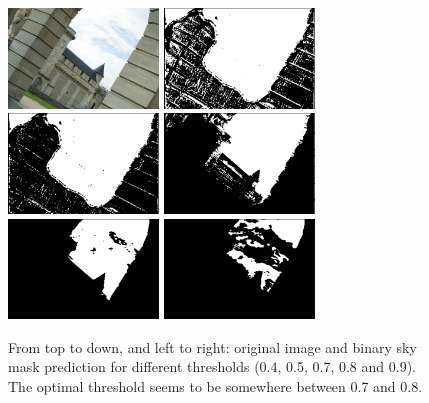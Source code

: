 \begin{itemize}
	\begin{figure}[!h]
		\begin{center}
			\includegraphics[width=40mm]{FIGS/SkyMask/im_thresh.JPG}
			\includegraphics[width=40mm]{FIGS/SkyMask/im_thresh_40.JPG}
			\includegraphics[width=40mm]{FIGS/SkyMask/im_thresh_50.JPG}
			\includegraphics[width=40mm]{FIGS/SkyMask/im_thresh_70.JPG}
			\includegraphics[width=40mm]{FIGS/SkyMask/im_thresh_80.JPG}
			\includegraphics[width=40mm]{FIGS/SkyMask/im_thresh_90.JPG}
			\caption{From top to down, and left to right: original image and binary sky mask prediction for different thresholds (0.4, 0.5, 0.7, 0.8 and 0.9). The optimal threshold seems to be somewhere between 0.7 and 0.8.}
		\end{center}	
	\end{figure}
	

\end{itemize}
